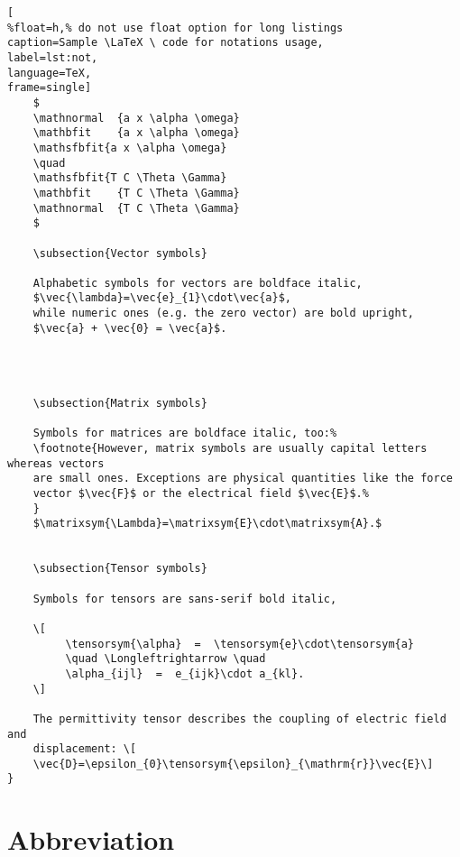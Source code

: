 \begin{lstlisting}[
%float=h,% do not use float option for long listings
caption=Sample \LaTeX \ code for notations usage, 
label=lst:not,
language=TeX,
frame=single]
	$
	\mathnormal  {a x \alpha \omega}
	\mathbfit    {a x \alpha \omega}
	\mathsfbfit{a x \alpha \omega}
	\quad
	\mathsfbfit{T C \Theta \Gamma}
	\mathbfit    {T C \Theta \Gamma}
	\mathnormal  {T C \Theta \Gamma}
	$

	\subsection{Vector symbols}

	Alphabetic symbols for vectors are boldface italic,
	$\vec{\lambda}=\vec{e}_{1}\cdot\vec{a}$,
	while numeric ones (e.g. the zero vector) are bold upright,
	$\vec{a} + \vec{0} = \vec{a}$.




	\subsection{Matrix symbols}

	Symbols for matrices are boldface italic, too:%
	\footnote{However, matrix symbols are usually capital letters whereas vectors
	are small ones. Exceptions are physical quantities like the force
	vector $\vec{F}$ or the electrical field $\vec{E}$.%
	}
	$\matrixsym{\Lambda}=\matrixsym{E}\cdot\matrixsym{A}.$


	\subsection{Tensor symbols}

	Symbols for tensors are sans-serif bold italic,

	\[
		 \tensorsym{\alpha}  =  \tensorsym{e}\cdot\tensorsym{a}
		 \quad \Longleftrightarrow \quad
		 \alpha_{ijl}  =  e_{ijk}\cdot a_{kl}.
	\]

	The permittivity tensor describes the coupling of electric field and
	displacement: \[
	\vec{D}=\epsilon_{0}\tensorsym{\epsilon}_{\mathrm{r}}\vec{E}\]
}

\end{lstlisting}
\cleardoublepage











\newpage
\section{Abbreviation}\
\label{sec:abbrv}

